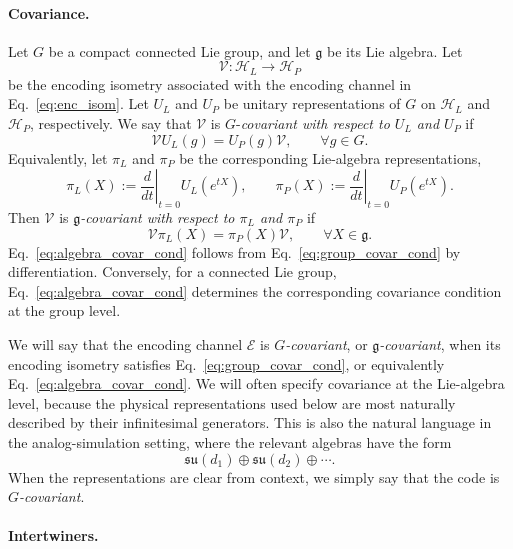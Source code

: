 \documentclass[10pt,twocolumn,superscriptaddress,aps,amsmath,amssymb,citeautoscript,floatfix,prx]{revtex4-2}
\newcounter{alg}
\theoremstyle{plain}
\theoremstyle{plain}
\theoremstyle{plain}
\theoremstyle{plain}
\theoremstyle{plain}
\theoremstyle{plain}
\theoremstyle{plain}
\theoremstyle{definition}
\theoremstyle{plain}
\begin{document}
\paragraph{Covariance.}

Let $G$ be a compact connected Lie group, and let $\mathfrak g$ be its Lie algebra. Let
$$
\mathcal{V}:\mathcal H_L\to\mathcal H_P
$$
be the encoding isometry associated with the encoding channel in Eq.~\eqref{eq:enc_isom}. 
Let $U_L$ and $U_P$ be unitary representations of $G$ on $\mathcal H_L$ and $\mathcal H_P$, respectively. 
We say that $\mathcal{V}$ is $G$-\textit{covariant with respect to $U_L$ and $U_P$} if
\begin{equation}\label{eq:group_covar_cond}
\mathcal{V}U_L(g)
=
U_P(g)\mathcal{V},
\qquad
\forall g\in G .
\end{equation}
Equivalently, let $\pi_L$ and $\pi_P$ be the corresponding Lie-algebra representations,
$$
\pi_L(X)
:=
\left.\frac{d}{dt}\right|_{t=0}
U_L(e^{tX}),
\qquad
\pi_P(X)
:=
\left.\frac{d}{dt}\right|_{t=0}
U_P(e^{tX}).
$$
Then $\mathcal{V}$ is \textit{$\mathfrak g$-covariant with respect to $\pi_L$ and $\pi_P$} if
\begin{equation}\label{eq:algebra_covar_cond}
\mathcal{V}\pi_L(X)
=
\pi_P(X)\mathcal{V},
\qquad
\forall X\in\mathfrak g .
\end{equation}
Eq.~\eqref{eq:algebra_covar_cond} follows from Eq.~\eqref{eq:group_covar_cond} by differentiation. 
Conversely, for a connected Lie group, Eq.~\eqref{eq:algebra_covar_cond} determines the corresponding covariance condition at the group level.

We will say that the encoding channel $\mathcal E$ is \textit{$G$-covariant}, or \textit{$\mathfrak g$-covariant}, 
when its encoding isometry satisfies Eq.~\eqref{eq:group_covar_cond}, or equivalently Eq.~\eqref{eq:algebra_covar_cond}. 
We will often specify covariance at the Lie-algebra level, because the physical representations used below are most naturally described by their infinitesimal generators. 
This is also the natural language in the analog-simulation setting, where the relevant algebras have the form
$$
\mathfrak{su}(d_1)
\oplus
\mathfrak{su}(d_2)
\oplus
\cdots .
$$
When the representations are clear from context, we simply say that the code is \textit{$G$-covariant}.

\paragraph{Intertwiners.}
\end{document}
